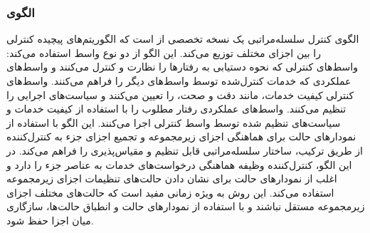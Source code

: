 \subsubsection{الگوی }
\label{archHierContSec}
\begin{RTL}
الگوی کنترل سلسله‌مراتبی یک نسخه تخصصی از 
است که الگوریتم‌های پیچیده کنترلی را بین اجزای مختلف توزیع می‌کند.
این الگو از دو نوع واسط استفاده می‌کند:
واسط‌های کنترلی که نحوه دستیابی به رفتارها را نظارت و کنترل می‌کنند
و واسط‌های عملکردی که خدمات کنترل‌شده توسط واسط‌های دیگر را فراهم می‌کنند.
واسط‌های کنترلی کیفیت خدمات، مانند دقت و صحت، را تعیین می‌کنند
و سیاست‌های اجرایی را تنظیم می‌کنند. واسط‌های عملکردی رفتار مطلوب
را با استفاده از کیفیت خدمات و سیاست‌های تنظیم شده توسط واسط
کنترلی اجرا می‌کنند. این الگو با استفاده از نمودارهای حالت برای
هماهنگی اجزای زیرمجموعه و تجمیع اجزای جزء به کنترل‌کننده
از طریق ترکیب، ساختار سلسله‌مراتبی قابل تنظیم و مقیاس‌پذیری را
فراهم می‌کند. در این الگو، کنترل‌کننده وظیفه هماهنگی درخواست‌های
خدمات به عناصر جزء را دارد و اغلب از نمودارهای حالت برای نشان
دادن حالت‌های تنظیمات اجزای زیرمجموعه استفاده می‌کند. این روش
به ویژه زمانی مفید است که حالت‌های مختلف اجزای زیرمجموعه مستقل
نباشند و با استفاده از نمودارهای حالت و انطباق حالت‌ها، سازگاری میان اجزا حفظ شود.
\end{RTL}